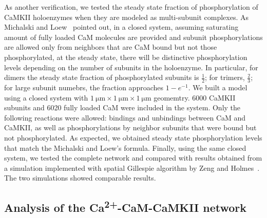 \documentclass[10pt,letterpaper]{article}
\begin{document}
As another verification, we tested the steady state fraction of phosphorylation of CaMKII holoenzymes when they are modeled as multi-subunit complexes. As Michalski and Loew~\cite{Michalski:2012ds} pointed out, in a closed system, assuming saturating amount of fully loaded CaM molecules are provided and subunit phosphorylations are allowed only from neighbors that are CaM bound but not those phosphorylated, at the steady state, there will be distinctive phosphorylation levels depending on the number of subunits in the holoenzyme. In particular, for dimers the steady state fraction of phosphorylated subunits is $\frac{1}{2}$; for trimers, $\frac{2}{3}$; for large subunit numebrs, the fraction approaches $1-e^{-1}$. We built a model using a closed system with $\SI{1}{\um}\times\SI{1}{\um}\times\SI{1}{\um}$ geomemtry. 6000 CaMKII subunits and 6020 fully loaded CaM were included in the system. Only the following reactions were allowed: bindings and unbindings between CaM and CaMKII, as well as phosphorylations by neighbor subunits that were bound but not phosphorylated. As expected, we obtained steady state phosphorylation levels that match the Michalski and Loew's formula. Finally, using the same closed system, we tested the complete network and compared with results obtained from a simulation implemented with spatial Gillespie algorithm by Zeng and Holmes~\cite{Zeng:2010bq}. The two simulations showed comparable results.

\subsection*{Analysis of the Ca\textsuperscript{2+}-CaM-CaMKII network}
\end{document}
